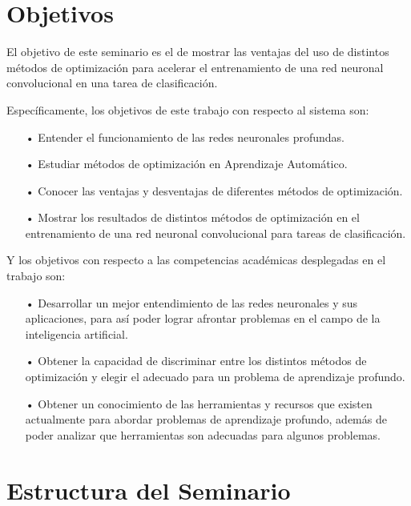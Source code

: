 \section{Objetivos}

El objetivo de este seminario es el de mostrar las ventajas del uso de distintos métodos de optimización para acelerar el entrenamiento de una red neuronal convolucional en una tarea de clasificación.

Específicamente, los objetivos de este trabajo con respecto al sistema son:

\begin{itemize}
\item[•] Entender el funcionamiento de las redes neuronales profundas.%

\item[•] Estudiar métodos de optimización en Aprendizaje Automático.

\item[•] Conocer las ventajas y desventajas de diferentes métodos de optimización.
\item[•] Mostrar los resultados de distintos métodos de optimización en el entrenamiento de una red neuronal convolucional para tareas de clasificación.



\end{itemize}

Y los objetivos con respecto a las competencias académicas desplegadas en el trabajo son:
\begin{itemize}
\item[•] Desarrollar un mejor entendimiento de las redes neuronales y sus aplicaciones, para así poder lograr afrontar problemas en el campo de la inteligencia artificial. %
\item[•] Obtener la capacidad de discriminar entre los distintos métodos de optimización y elegir el adecuado para un problema de aprendizaje profundo.%
\item[•] Obtener un conocimiento de las herramientas y recursos que existen actualmente para abordar problemas de aprendizaje profundo, además de poder analizar que herramientas son adecuadas para algunos problemas.
\end{itemize}

\section{Estructura del Seminario}


